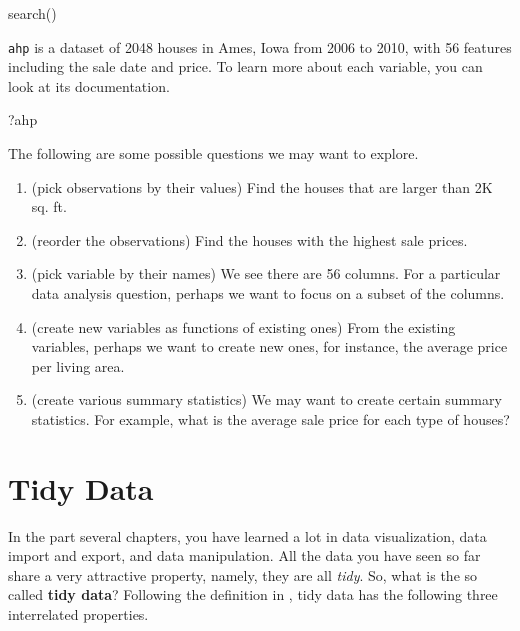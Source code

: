 \documentclass[
]{book}
\newenvironment{Shaded}{\begin{snugshade}}{\end{snugshade}}
\newcommand{\FunctionTok}[1]{\textcolor[rgb]{0.00,0.00,0.00}{#1}}
\newcommand{\NormalTok}[1]{#1}
\begin{document}
\begin{Shaded}
\begin{Highlighting}[]
\FunctionTok{search}\NormalTok{()}
\end{Highlighting}
\end{Shaded}

\texttt{ahp} is a dataset of 2048 houses in Ames, Iowa from 2006 to 2010, with 56 features including the sale date and price. To learn more about each variable, you can look at its documentation.

\begin{Shaded}
\begin{Highlighting}[]
\NormalTok{?ahp}
\end{Highlighting}
\end{Shaded}

The following are some possible questions we may want to explore.

\begin{enumerate}
\def\labelenumi{\arabic{enumi}.}
\item
  (pick observations by their values) Find the houses that are larger than 2K sq. ft.
\item
  (reorder the observations) Find the houses with the highest sale prices.
\item
  (pick variable by their names) We see there are 56 columns. For a particular data analysis question, perhaps we want to focus on a subset of the columns.
\item
  (create new variables as functions of existing ones) From the existing variables, perhaps we want to create new ones, for instance, the average price per living area.
\item
  (create various summary statistics) We may want to create certain summary statistics. For example, what is the average sale price for each type of houses?
\end{enumerate}

\hypertarget{tidy-data}{%
\chapter{Tidy Data}\label{tidy-data}}

In the part several chapters, you have learned a lot in data visualization, data import and export, and data manipulation. All the data you have seen so far share a very attractive property, namely, they are all \emph{tidy}. So, what is the so called \textbf{tidy data}? Following the definition in \citet{wickham2016r}, tidy data has the following three interrelated properties.
\end{document}
